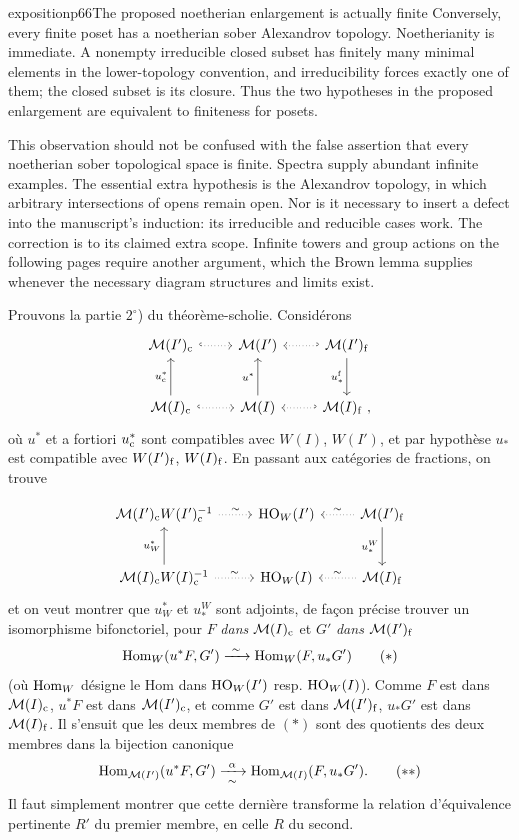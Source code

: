 \begin{dcomment}{exposition}{p66}{The proposed noetherian enlargement is actually finite}
Conversely, every finite poset has a noetherian sober Alexandrov topology. Noetherianity is immediate. A nonempty irreducible closed subset has finitely many minimal elements in the lower-topology convention, and irreducibility forces exactly one of them; the closed subset is its closure. Thus the two hypotheses in the proposed enlargement are equivalent to finiteness for posets.

This observation should not be confused with the false assertion that every noetherian sober topological space is finite. Spectra supply abundant infinite examples. The essential extra hypothesis is the Alexandrov topology, in which arbitrary intersections of opens remain open. Nor is it necessary to insert a defect into the manuscript's induction: its irreducible and reducible cases work. The correction is to its claimed extra scope. Infinite towers and group actions on the following pages require another argument, which the Brown lemma supplies whenever the necessary diagram structures and limits exist.
\end{dcomment}


Prouvons la partie $2^\circ$) du théorème-scholie. Considérons
\[
\begin{tikzcd}[row sep=large]
\cM(I')_{\rc} \arrow[r, hook, dotted] & \cM(I') & \cM(I')_{\rf} \arrow[l, hook', dotted] \arrow[d, "u_*^{\rf}"'] \\
\cM(I)_{\rc} \arrow[r, hook, dotted] \arrow[u, "u_{\rc}^*"] & \cM(I) \arrow[u, "u^*"] & \cM(I)_{\rf} \ , \arrow[l, hook', dotted]
\end{tikzcd}
\]
où $u^*$ et a fortiori $u_{\mathrm{c}}^*$ sont compatibles avec $W(I)$, $W(I')$, et par hypothèse $u_*$ est compatible avec $W(I')_{\mathrm{f}}$, $W(I)_{\mathrm{f}}$. En passant aux catégories de fractions, on trouve

\[
\begin{tikzcd}[row sep=large]
\cM(I')_{\rc}W(I')_{\rc}^{-1} \arrow[r, dotted, "\sim"] & \HO_W(I') & \cM(I')_{\rf} \arrow[l, dotted, "\sim"'] \arrow[d, "u_*^W"'] \\
\cM(I)_{\rc}W(I)_{\rc}^{-1} \arrow[r, dotted, "\sim"] \arrow[u, "u_W^*"] & \HO_W(I) & \cM(I)_{\rf} \arrow[l, dotted, "\sim"']
\end{tikzcd}
\]
 et on veut montrer que $u_W^*$ et $u_*^W$ sont adjoints, de façon précise trouver un isomorphisme bifonctoriel, pour $F$ \textit{dans} $\mathcal{M}(I)_{\mathrm{c}}$ et $G'$ \textit{dans} $\mathcal{M}(I')_{\mathrm{f}}$
\[
\Hom_W(u^*F, G') \xrightarrow{\ \sim\ } \Hom_W(F, u_*G') \tag*{$(*)$}
\]
(où $\mathrm{Hom}_W$ désigne le Hom dans $\mathrm{HO}_W(I')$ resp. $\mathrm{HO}_W(I)$). Comme $F$ est dans $\mathcal{M}(I)_{\mathrm{c}}$, $u^*F$ est dans $\mathcal{M}(I')_{\mathrm{c}}$, et comme $G'$ est dans $\mathcal{M}(I')_{\mathrm{f}}$, $u_*G'$ est dans $\mathcal{M}(I)_{\mathrm{f}}$. Il s'ensuit que les deux membres de $(*)$ sont des quotients des deux membres dans la bijection canonique
\[
\Hom_{\cM(I')}(u^*F, G') \xrightarrow[\ \sim\ ]{\alpha} \Hom_{\cM(I)}(F, u_*G'). \tag*{$(**)$}
\]
Il faut simplement montrer que cette dernière transforme la relation d'équivalence pertinente $R'$ du premier membre,
en celle $R$ du second.

